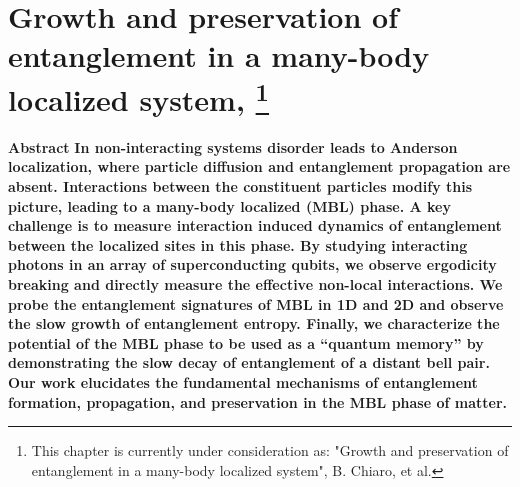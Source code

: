 %
\chapter[MBL]{Growth and preservation of entanglement in a many-body localized system,
\footnote{This chapter is currently under consideration as: "Growth and preservation of entanglement in a many-body localized system", B. Chiaro, et al.}}


{\textbf{\centering Abstract}}
\textbf{In non-interacting systems disorder leads to Anderson localization, where particle diffusion and entanglement propagation are absent.
Interactions between the constituent particles modify this picture, leading to a many-body localized (MBL) phase.
A key challenge is to measure interaction induced dynamics of entanglement between the localized sites in this phase.
By studying interacting photons in an array of superconducting qubits, we observe ergodicity breaking and directly measure the effective non-local interactions.
We probe the entanglement signatures of MBL in 1D and 2D and observe the slow growth of entanglement entropy.
Finally, we characterize the potential of the MBL phase to be used as a “quantum memory” by demonstrating the slow decay of entanglement of a distant bell pair.
Our work elucidates the fundamental mechanisms of entanglement formation, propagation, and preservation in the MBL phase of matter.}

